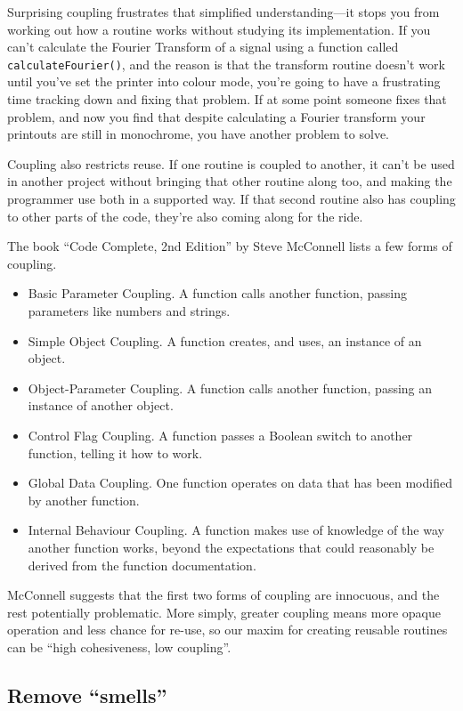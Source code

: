 \documentclass[a4paper]{article}
\begin{document}
Surprising coupling frustrates that simplified understanding---it stops you from working out how a routine works without studying its implementation.
If you can't calculate the Fourier Transform of a signal using a function called \texttt{calculateFourier()}, and the reason is that the transform routine doesn't work until you've set the printer into colour mode, you're going to have a frustrating time tracking down and fixing that problem.
If at some point someone fixes that problem, and now you find that despite calculating a Fourier transform your printouts are still in monochrome, you have another problem to solve.

Coupling also restricts reuse.
If one routine is coupled to another, it can't be used in another project without bringing that other routine along too, and making the programmer use both in a supported way.
If that second routine also has coupling to other parts of the code, they're also coming along for the ride.

The book ``Code Complete, 2nd Edition'' by Steve McConnell\cite{cc2e} lists a few forms of coupling.

\begin{itemize}
\item Basic Parameter Coupling. A function calls another function, passing parameters like numbers and strings.
\item Simple Object Coupling. A function creates, and uses, an instance of an object.
\item Object-Parameter Coupling. A function calls another function, passing an instance of another object.
\item Control Flag Coupling. A function passes a Boolean switch to another function, telling it how to work.
\item Global Data Coupling. One function operates on data that has been modified by another function.
\item Internal Behaviour Coupling. A function makes use of knowledge of the way another function works, beyond the expectations that could reasonably be derived from the function documentation.
\end{itemize}

McConnell suggests that the first two forms of coupling are innocuous, and the rest potentially problematic.
More simply, greater coupling means more opaque operation and less chance for re-use, so our maxim for creating reusable routines can be ``high cohesiveness, low coupling''.

\subsection{Remove ``smells''}
\end{document}
